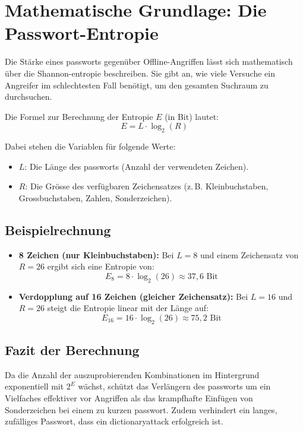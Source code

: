 \documentclass[12pt,a4paper]{article}
\begin{document}
\section{Mathematische Grundlage: Die Passwort-Entropie}
Die Stärke eines \gls{passwort}s gegenüber Offline-Angriffen lässt sich mathematisch über die Shannon-\gls{entropie} beschreiben. Sie gibt an, wie viele Versuche ein Angreifer im schlechtesten Fall benötigt, um den gesamten Suchraum zu durchsuchen.

Die Formel zur Berechnung der Entropie $E$ (in Bit) lautet:
\[
E = L \cdot \log_2(R)
\]

Dabei stehen die Variablen für folgende Werte:
\begin{itemize}
    \item $L$: Die Länge des \gls{passwort}s (Anzahl der verwendeten Zeichen).
    \item $R$: Die Grösse des verfügbaren Zeichensatzes (z.\,B. Kleinbuchstaben, Grossbuchstaben, Zahlen, Sonderzeichen).
\end{itemize}

\subsection{Beispielrechnung}
\begin{itemize}
    \item \textbf{8 Zeichen (nur Kleinbuchstaben):} Bei $L = 8$ und einem Zeichensatz von $R = 26$ ergibt sich eine Entropie von:
    \[
    E_8 = 8 \cdot \log_2(26) \approx 37{,}6 \text{ Bit}
    \]
    \item \textbf{Verdopplung auf 16 Zeichen (gleicher Zeichensatz):} Bei $L = 16$ und $R = 26$ steigt die Entropie linear mit der Länge auf:
    \[
    E_{16} = 16 \cdot \log_2(26) \approx 75{,}2 \text{ Bit}
    \]
\end{itemize}

\subsection{Fazit der Berechnung}
Da die Anzahl der auszuprobierenden Kombinationen im Hintergrund exponentiell mit $2^E$ wächst, schützt das Verlängern des \gls{passwort}s um ein Vielfaches effektiver vor Angriffen als das krampfhafte Einfügen von Sonderzeichen bei einem zu kurzen \gls{passwort}. Zudem verhindert ein langes, zufälliges Passwort, dass ein \gls{dictionaryattack} erfolgreich ist.
\end{document}
